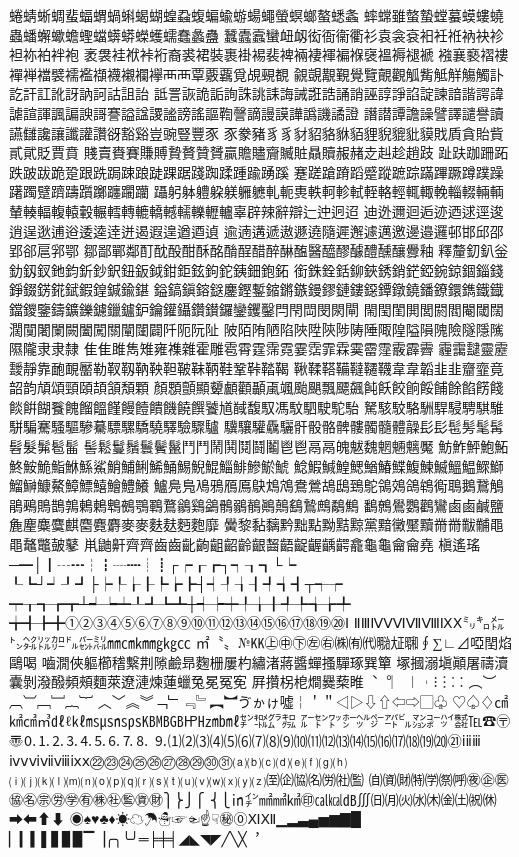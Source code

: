 蜷蜻蜥蜩蜚蝠蝟蝸蝌蝎蝴蝗蝨蝮蝙蝓蝣蝪蠅螢螟螂螯蟋螽
蟀蟐雖螫蟄螳蟇蟆螻蟯蟲蟠蠏蠍蟾蟶蟷蠎蟒蠑蠖蠕蠢蠡蠱
蠶蠹蠧蠻衄衂衒衙衞衢衫袁衾袞衵衽袵衲袂袗袒袮袙袢袍
袤袰袿袱裃裄裔裘裙裝裹褂裼裴裨裲褄褌褊褓襃褞褥褪褫
襁襄褻褶褸襌褝襠襞襦襤襭襪襯襴襷⾑襾覃覈覊覓覘覡覩
覦覬覯覲覺覽覿觀觚觜觝觧觴觸訃訖訐訌訛訝訥訶詁詛詒
詆詈詼詭詬詢誅誂誄誨誡誑誥誦誚誣諄諍諂諚諫諳諧諤諱
謔諠諢諷諞諛謌謇謚諡謖謐謗謠謳鞫謦謫謾謨譁譌譏譎證
譖譛譚譫譟譬譯譴譽讀讌讎讒讓讖讙讚谺豁谿豈豌豎豐⾗
豕豢豬⾘豸豺貂貉貅貊貍貎貔豼貘戝貭貪貽貲貳貮貶賈賁
賤賣賚賽賺賻贄贅贊贇贏贍贐齎贓賍贔贖赧赭赱赳趁趙跂
趾趺跏跚跖跌跛跋跪跫跟跣跼踈踉跿踝踞踐踟蹂踵踰踴蹊
蹇蹉蹌蹐蹈蹙蹤蹠踪蹣蹕蹶蹲蹼躁躇躅躄躋躊躓躑躔躙躪
躡躬躰軆躱躾軅軈軋軛軣軼軻軫軾輊輅輕輒輙輓輜輟輛輌
輦輳輻輹轅轂輾轌轉轆轎轗轜轢轣轤辜辟辣辭辯辷迚迥迢
迪迯邇迴逅迹迺逑逕逡逍逞逖逋逧逶逵逹迸遏遐遑遒逎遉
逾遖遘遞遨遯遶隨遲邂遽邁邀邊邉邏邨邯邱邵郢郤扈郛鄂
鄒鄙鄲鄰酊酖酘酣酥酩酳酲醋醉醂醢醫醯醪醵醴醺釀釁釉
釋釐釖釟釡釛釼釵釶鈞釿鈔鈬鈕鈑鉞鉗鉅鉉鉤鉈銕鈿鉋鉐
銜銖銓銛鉚鋏銹銷鋩錏鋺鍄錮錙錢錚錣錺錵錻鍜鍠鍼鍮鍖
鎰鎬鎭鎔鎹鏖鏗鏨鏥鏘鏃鏝鏐鏈鏤鐚鐔鐓鐃鐇鐐鐶鐫鐵鐡
鐺鑁鑒鑄鑛鑠鑢鑞鑪鈩鑰鑵鑷鑽鑚鑼鑾钁鑿閂閇閊閔閖閘
閙閠閨閧閭閼閻閹閾闊濶闃闍闌闕闔闖關闡闥闢阡阨阮阯
陂陌陏陋陷陜陞陝陟陦陲陬隍隘隕隗險隧隱隲隰隴⾪隶隸
⾫隹雎雋雉雍襍雜霍雕雹霄霆霈霓霎霑霏霖霙霤霪霰霹霽
霾靄靆靈靂靉靜靠靤靦靨勒靫靱靹鞅靼鞁靺鞆鞋鞏鞐鞜鞨
鞦鞣鞳鞴韃韆韈⾱韋韜⾲韭齏韲竟韶韵頏頌頸頤頡頷頽顆
顏顋顫顯顰顱顴顳颪颯颱颶飄飃飆飩飫餃餉餒餔餘餡餝餞
餤餠餬餮餽餾饂饉饅饐饋饑饒饌饕馗馘馥馭馮馼駟駛駝駘
駑駭駮駱駲駻駸騁騏騅駢騙騫騷驅驂驀驃騾驕驍驛驗驟驢
驥驤驩驫驪骭骰骼髀髏髑髓體髞⾽髟髢髣髦髯髫髮髴髱髷
髻鬆鬘鬚鬟鬢鬣⾾鬥鬧鬨鬩鬪鬮⾿鬯鬲⿀魄魃魏魍魎魑魘
魴鮓鮃鮑鮖鮗鮟鮠鮨鮴鯀鯊鮹鯆鯏鯑鯒鯣鯢鯤鯔鯡鰺鯲鯱
鯰鰕鰔鰉鰓鰌鰆鰈鰒鰊鰄鰮鰛鰥鰤鰡鰰鱇鰲鱆鰾鱚鱠鱧鱶
鱸鳧鳬鳰鴉鴈鳫鴃鴆鴪鴦鶯鴣鴟鵄鴕鴒鵁鴿鴾鵆鵈鵝鵞鵤
鵑鵐鵙鵲鶉鶇鶫鵯鵺鶚鶤鶩鶲鷄鷁鶻鶸鶺鷆鷏鷂鷙鷓鷸鷦
鷭鷯鷽鸚鸛鸞⿄鹵鹹鹽麁麈麋麌麒麕麑麝⿆麥麩麸麪麭靡
黌黎黏黐黔黜點黝黠黥黨黯黴黶黷⿋黹黻黼⿌黽鼇鼈皷鼕
鼡鼬鼾齊⿑齒⿒齔齣齟齠齡齦齧齬齪齷齲齶龕龜⿔龠⿕堯
槇遙瑤─━│┃┄┅┆┇┈┉┊┋┌┍┎┏┐┑┒┓└┕
┖┗┘┙┚┛├┝┞┟┠┡┢┣┤┥┦┧┨┩┪┫┬┭┮
┯┰┱┲┳┴┵┶┷┸┹┺┻┼┽┾┿╀╁╂╃╄╅╆╇
╈╉╊╋①②③④⑤⑥⑦⑧⑨⑩⑪⑫⑬⑭⑮⑯⑰⑱⑲⑳Ⅰ
ⅡⅢⅣⅤⅥⅦⅧⅨⅩ㍉㌔㍍㌧㌶㍑㌍㌦㌫㍊㎜㎝㎞㎎㎏㏄
㎡〝〟№㏍㊤㊥㊦㊧㊨㈱㈲㈹㍾㍽㍼∮∑∟⊿啞𨳝焰鷗喝
嚙㵎俠軀櫛𥡴繫荆𨻶鹼昻麴栅屢杓繡渚蔣醬蟬搔驒琢巽簞
塚摑溺塡顚屠禱瀆囊剝潑醱頻頰麵萊遼漣煉蓮蠟兔冕冤𡨚
屛攢柺梎𤏐爨蔾睢︑︒︳︱︲⁝︙⁚︰︵︶︹︺﹇﹈︷︸
︿﹀︽︾﹁﹂﹃﹄︻︼ゔゕゖ噓￤＇＂◁▷⇩⇧⇦⇨▢♧
♡♤♢㎠㎢㎤㎥㎗ℓ㎘㎳㎲㎱㎰㎅㎆㎇㏋㎐㏔㎖㌢㌖㌘㌕
㌃㌣㍗㍂㌹㌻㌀㌱㍇㌞㌪㍿℡☎〶〠🄀⒈⒉⒊⒋⒌⒍⒎⒏
⒐⑴⑵⑶⑷⑸⑹⑺⑻⑼⑽⑾⑿⒀⒁⒂⒃⒄⒅⒆⒇㉑ⅰⅱⅲ
ⅳⅴⅵⅶⅷⅸⅹ㉒㉓㉔㉕㉖㉗㉘㉙㉚㉛⒜⒝⒞⒟⒠⒡⒢⒣
⒤⒥⒦⒧⒨⒩⒪⒫⒬⒭⒮⒯⒰⒱⒲⒳⒴⒵㉃㈽㈿㈴㈸㈳㈼
㉂㈾㈶㈵㈻㉀㈺㊰㊭㊩㊯㊔㊪㊘㊫㊒㊑㊓㊬㊮㊖⎫⎬⎭⎧
⎨⎩㏌㌅㎟㎣㎦㊞㎈㎉㏈∭㈰㈪㈫㈬㈭㈮㈯㈷㉁➡⬅⬆⬇
◉♠♥♣♦☀☁☂☃☞☜☝☟㊙⓪ⅪⅫ▁▂▃▄▅▆▇█
▏▎▍▌▋▊▉▔▕╭╮╰╯═╞╪╡◢◣◥◤╱╲╳︐



